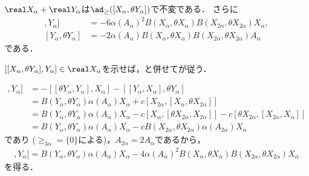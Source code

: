 \vspace{-1em}
\begin{lem}\label{lem:3.4}  
  $\real X_{\alpha} + \real Y_{\alpha} $は$\ad_{\ge}([X_{\alpha}, \theta Y_{\alpha}]) $で不変である．  
  さらに
  \begin{align*}
    [[X_{\alpha}, \theta Y_{\alpha}], Y_{\alpha}] &= -6\alpha(A_{\alpha})^2B(X_{\alpha}, \theta X_{\alpha})B(X_{2\alpha}, \theta X_{2\alpha})X_{\alpha},\\
  [Y_{\alpha}, \theta Y_{\alpha}] &= -2\alpha(A_{\alpha})B(X_{\alpha}, \theta X_{\alpha})B(X_{2\alpha}, \theta X_{2\alpha})A_{\alpha}
  \end{align*}
  である．

\end{lem}

\begin{npfwn}
  $[[X_{\alpha}, \theta Y_{\alpha}], Y_{\alpha}]  \in \real X_{\alpha} $を示せば，と併せてが従う．

  
  \begin{align*}
    [[X_{\alpha}, \theta Y_{\alpha}], Y_{\alpha}] &= -[[\theta Y_{\alpha}, Y_{\alpha}], X_{\alpha}] - [[Y_{\alpha}, X_{\alpha}], \theta Y_{\alpha}] \\
                                                  &= B(Y_{\alpha}, \theta Y_{\alpha})\alpha(A_{\alpha})X_{\alpha} +c[X_{2\alpha},[X_{\alpha}, \theta X_{2\alpha}]] \\
                                                  &= B(Y_{\alpha}, \theta Y_{\alpha})\alpha(A_{\alpha})X_{\alpha} - c[X_{\alpha}, [\theta X_{2\alpha}, X_{2\alpha}]] - c[\theta X_{2\alpha},[X_{2\alpha},X_{\alpha}]] \\
                                                  &= B(Y_{\alpha}, \theta Y_{\alpha})\alpha(A_{\alpha})X_{\alpha} - cB(X_{2\alpha},\theta X_{2\alpha})\alpha(A_{2\alpha})X_{\alpha}
  \end{align*}
  であり ($ \ge_{3\alpha} = \{0\} $による)，$A_{2\alpha} = 2A_{\alpha} $であるから，
  \begin{align*}
[[X_{\alpha}, \theta Y_{\alpha}], Y_{\alpha}] =  B(Y_{\alpha}, \theta Y_{\alpha})\alpha(A_{\alpha})X_{\alpha} - 4\alpha(A_{\alpha})^2B(X_{\alpha}, \theta X_{\alpha})B(X_{2\alpha}, \theta X_{2\alpha})X_{\alpha}
  \end{align*}
  を得る．


\end{npfwn}
